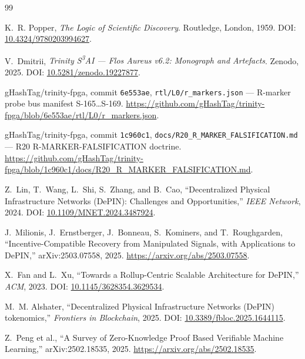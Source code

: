
\begin{thebibliography}{99}

K.~R. Popper,
\textit{The Logic of Scientific Discovery}.
Routledge, London, 1959.
DOI: \href{https://doi.org/10.4324/9780203994627}{10.4324/9780203994627}.

V.~Dmitrii,
\textit{Trinity S\textsuperscript{3}AI — Flos Aureus v6.2: Monograph and Artefacts}.
Zenodo, 2025.
DOI: \href{https://doi.org/10.5281/zenodo.19227877}{10.5281/zenodo.19227877}.

gHashTag/trinity-fpga, commit \texttt{6e553ae},
\texttt{rtl/L0/r\_markers.json} — R-marker probe bus manifest S-165\ldots S-169.
\url{https://github.com/gHashTag/trinity-fpga/blob/6e553ae/rtl/L0/r_markers.json}.

gHashTag/trinity-fpga, commit \texttt{1c960c1},
\texttt{docs/R20\_R\_MARKER\_FALSIFICATION.md} — R20 R-MARKER-FALSIFICATION doctrine.
\url{https://github.com/gHashTag/trinity-fpga/blob/1c960c1/docs/R20_R_MARKER_FALSIFICATION.md}.

Z.~Lin, T.~Wang, L.~Shi, S.~Zhang, and B.~Cao,
``Decentralized Physical Infrastructure Networks (DePIN): Challenges and
Opportunities,''
\textit{IEEE Network}, 2024.
DOI: \href{https://doi.org/10.1109/MNET.2024.3487924}{10.1109/MNET.2024.3487924}.

J.~Milionis, J.~Ernstberger, J.~Bonneau, S.~Kominers, and T.~Roughgarden,
``Incentive-Compatible Recovery from Manipulated Signals, with Applications to
DePIN,'' arXiv:2503.07558, 2025.
\url{https://arxiv.org/abs/2503.07558}.

X.~Fan and L.~Xu,
``Towards a Rollup-Centric Scalable Architecture for DePIN,''
\textit{ACM}, 2023.
DOI: \href{https://doi.org/10.1145/3628354.3629534}{10.1145/3628354.3629534}.

M.~M. Alshater,
``Decentralized Physical Infrastructure Networks (DePIN) tokenomics,''
\textit{Frontiers in Blockchain}, 2025.
DOI: \href{https://doi.org/10.3389/fbloc.2025.1644115}{10.3389/fbloc.2025.1644115}.

Z.~Peng et al.,
``A Survey of Zero-Knowledge Proof Based Verifiable Machine Learning,''
arXiv:2502.18535, 2025.
\url{https://arxiv.org/abs/2502.18535}.


\end{thebibliography}
